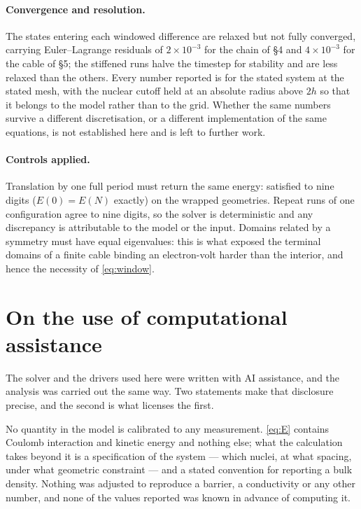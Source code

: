 \documentclass[11pt]{article}
\begin{document}
\paragraph{Convergence and resolution.} The states entering each windowed difference are relaxed
but not fully converged, carrying Euler--Lagrange residuals of $2\times10^{-3}$ for the chain of
\S4 and $4\times10^{-3}$ for the cable of \S5; the stiffened runs halve the timestep for stability
and are less relaxed than the others. Every number
reported is for the stated system at the stated mesh, with the nuclear cutoff held at an absolute
radius above $2h$ so that it belongs to the model rather than to the grid. Whether the same numbers
survive a different discretisation, or a different implementation of the same equations, is not
established here and is left to further work.

\paragraph{Controls applied.} Translation by one full period must return the same energy: satisfied
to nine digits ($E(0)=E(N)$ exactly) on the wrapped geometries. Repeat runs of one configuration
agree to nine digits, so the solver is deterministic and any discrepancy is attributable to the
model or the input. Domains related by a symmetry must have equal eigenvalues: this is what exposed
the terminal domains of a finite cable binding an electron-volt harder than the interior, and hence
the necessity of \eqref{eq:window}.

\section*{On the use of computational assistance}

The solver and the drivers used here were written with AI assistance, and the analysis was carried
out the same way. Two statements make that disclosure precise, and the second is what licenses the
first.

No quantity in the model is calibrated to any measurement. \eqref{eq:E} contains Coulomb
interaction and kinetic energy and nothing else; what the calculation takes beyond it is a
specification of the system --- which nuclei, at what spacing, under what geometric constraint ---
and a stated convention for reporting a bulk density. Nothing was adjusted to reproduce a barrier, a
conductivity or any other number, and none of the values reported was known in advance of computing
it.
\end{document}

